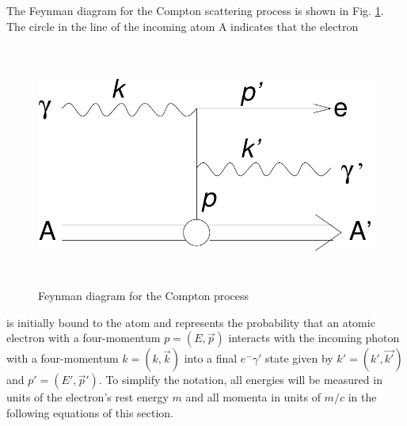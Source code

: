 The Feynman diagram for the Compton scattering process is 
shown in Fig. \ref{compt_fig}. The circle in the line 
of the incoming atom A indicates that the electron 
\begin{figure}[h]
\includegraphics[height=8cm,width=12cm]{figures/compt}
\caption{\label{compt_fig} Feynman diagram for the Compton process}
\end{figure}
is initially bound to the atom and represents the probability 
that an atomic electron with a four-momentum $p = (E,\vec{p})$ 
interacts with the incoming photon with a four-momentum 
$k=(k,\vec{k})$ into a final $e^-\gamma'$ state given by 
$k'=(k',\vec{k'})$ and $p'=(E',\vec{p}')$. 
To simplify the notation, all energies will be measured 
in units of the electron's rest energy $m$ and all momenta 
in units of $m/c$ in the following equations of this 
section. 

